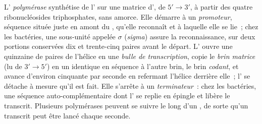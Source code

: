 \begin{definition}\label{def:b1:gene-expression:transcription}
L'\emph{ polymérase} synthétise de l' sur une matrice d', de
$5' \to 3'$, à partir des quatre ribonucléosides triphosphates, sans
amorce. Elle démarre à un \emph{promoteur}, séquence située juste en
amont du , qu'elle reconnaît et à laquelle elle se lie~; chez les
bactéries, une sous-unité appelée $\sigma$ (\emph{sigma}) assure la
reconnaissance, sur deux portions conservées dix et trente-cinq paires
avant le départ. L' ouvre une quinzaine de paires de l'hélice en
une \emph{bulle de transcription}, copie le \emph{brin matrice} (lu de
$3' \to 5'$) en un  identique en séquence à l'autre brin, le brin
\emph{codant}, et avance d'environ cinquante  par seconde en
refermant l'hélice derrière elle~; l' se détache à mesure qu'il est
fait. Elle s'arrête à un \emph{terminateur}~: chez les bactéries, une
séquence auto-complémentaire dont l' se replie en épingle et libère
le transcrit. Plusieurs polymérases peuvent se suivre le long d'un ,
de sorte qu'un transcrit peut être lancé chaque seconde.
\end{definition}

